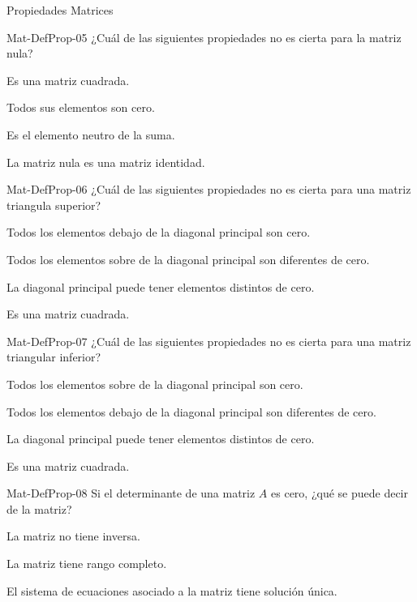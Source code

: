 \documentclass[a4,11pt]{aleph-notas}
\begin{document}
\begin{quiz}{Propiedades Matrices}
\begin{multi}[]%
    {Mat-DefProp-05}
    ¿Cuál de las siguientes propiedades no es cierta para la matriz nula?
    \item Es una matriz cuadrada.
    \item Todos sus elementos son cero.
    \item Es el elemento neutro de la suma.
    \item* La matriz nula es una matriz identidad.
\end{multi}

\begin{multi}[]%
    {Mat-DefProp-06}
    ¿Cuál de las siguientes propiedades no es cierta para una matriz triangula superior?
    \item Todos los elementos debajo de la diagonal principal son cero.
    \item* Todos los elementos sobre de la diagonal principal son diferentes de cero.
    \item La diagonal principal puede tener elementos distintos de cero.
    \item Es una matriz cuadrada.
\end{multi}

\begin{multi}[]%
    {Mat-DefProp-07}
    ¿Cuál de las siguientes propiedades no es cierta para una matriz triangular inferior?
    \item Todos los elementos sobre de la diagonal principal son cero.
    \item* Todos los elementos debajo de la diagonal principal son diferentes de cero.
    \item La diagonal principal puede tener elementos distintos de cero.
    \item Es una matriz cuadrada.
\end{multi}

\begin{multi}[]%
    {Mat-DefProp-08}
    Si el determinante de una matriz $A$ es cero, ¿qué se puede decir de la matriz?
    \item* La matriz no tiene inversa.
    \item La matriz tiene rango completo.
    \item El sistema de ecuaciones asociado a la matriz tiene solución única.
\end{multi}


\end{quiz}
\end{document}
